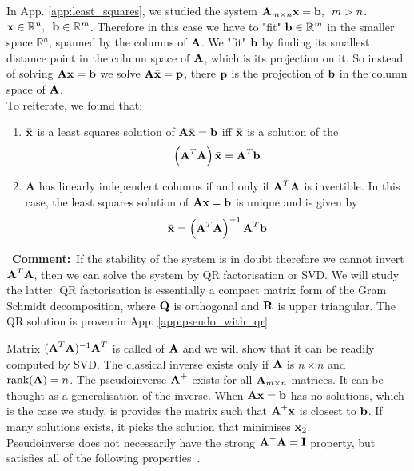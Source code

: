 \documentclass[a4paper]{article}
\numberwithin{equation}{section} %
\newcounter{solution}
\newcommand{\setR}{\mathbb{R}} %
\newcommand{\setRn}{\mathbb{R}^n} %
\newcommand{\rank}{\textup{rank}}
\newcommand{\hquad}{\hskip0.5em\relax}%
\newcommand{\B}[1]{\textbf{\textup{#1}}} %
\newcommand{\emphasis}[1]{\textls{#1}}
\newcommand{\mycomment}[1]{\begin{leftrightbox}\Pointinghand~\textbf{Comment:}~#1 \end{leftrightbox}}
\begin{document}
In App. \ref{app:least_squares}, we studied the system $\B{A}_{m \times n}\B{x} = \B{b}, \hquad m>n$. $\B{x} \in \setRn, \hquad \B{b} \in \setR ^ m$. Therefore in this case we have to "fit" $\B{b} \in \setR^m$ in the smaller space $\setR^n$, spanned by the columns of $\B{A}$. We "fit" $\B{b}$ by finding its smallest distance point in the column space of $\B{A}$, which is its projection on it. So instead of solving $\B{Ax}=\B{b}$ we solve $\B{A}\bar{\B{x}}=\B{p}$, there $\B{p}$ is the projection of $\B{b}$ in the column space of $\B{A}$. \\
To reiterate, we found that:
\begin{enumerate}
\item $\bar{\B{x}}$ is a least squares solution of $\B{A}\bar{\B{x}}=\B{b}$ iff $\bar{\B{x}}$ is a solution of the \textup{\emphasis{normal equations}}
\begin{equation}
\left(\B{A}^T\B{A} \right)\bar{\B{x}} = \B{A}^T\B{b}
\end{equation}
\item \B{A} has linearly independent columns if and only if $\B{A}^T\B{A}$ is invertible. In this case, the least squares solution of $\B{Ax}=\B{b}$ is unique and is given by
\begin{equation}
\bar{\B{x}} =\left(\B{A}^T\B{A} \right)^{-1} \B{A}^T\B{b}
\label{eq:svd_pseudo_1}
\end{equation}
\end{enumerate}
\mycomment{If the stability of 	the system is in doubt therefore we cannot invert $\B{A}^T\B{A}$, then we can solve the system by QR factorisation or SVD. We will study the latter. QR factorisation is essentially a compact matrix form of the Gram Schmidt decomposition, where $\B{Q}$ is orthogonal and $\B{R}$ is upper triangular. The QR solution is proven in App. \ref{app:pseudo_with_qr}} %
Matrix $(\B{A}^T\B{A})^{-1}\B{A}^T$ is called \emphasis{pseudoinverse} of $\B{A}$ and we will show that it can be readily computed by SVD. The classical inverse exists only if $\B{A}$ is $n \times n$ and $\rank(\B{A})=n$. The pseudoinverse $\B{A}^{+}$ exists for all $\B{A}_{m \times n}$ matrices. It can be thought as a generalisation of the inverse. When $\B{Ax}=\B{b}$ has no solutions, which is the case we study, is provides the matrix such that $\B{A}^{+}\B{x}$ is closest to $\B{b}$. If many solutions exists, it picks the solution that minimises $\B{x}_2$.\\
Pseudoinverse does not necessarily have the strong $\B{A}^{+}\B{A}=\B{I}$ property, but satisfies all of the following properties~\cite{stackexch_pseudo_prop}.
\end{document}

